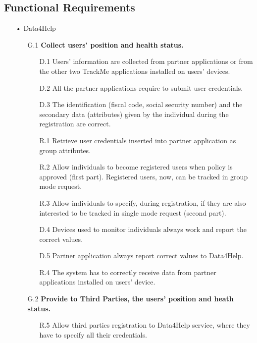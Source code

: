 \subsection{Functional Requirements}
\begin{enumerate}
\item[•]{\Large Data4Help}
	\begin{enumerate}
	\item [G.1] \textbf{Collect users' position and health status.}
		\begin{enumerate}
		\item [D.1] Users' information are collected from partner applications or from the other two TrackMe applications installed on users' devices.
		\item [D.2] All the partner applications require to submit user credentials.
		\item [D.3] The identification (fiscal code, social security number) and the secondary data (attributes) given by the individual during the registration are correct.
		\item [R.1] Retrieve user credentials inserted into partner application as group attributes.
		\item [R.2] Allow individuals to become registered users when policy is approved (first part). Registered users, now, can be tracked in group mode request.  
		\item [R.3] Allow individuals to specify, during registration, if they are also interested to be tracked in single mode request (second part).
		\item [D.4] Devices used to monitor individuals always work and report 			the correct values.	
    	\item [D.5] Partner application always report correct values to Data4Help.
    	\item [R.4] The system has to correctly receive data from partner applications installed on users' device.
    	\end{enumerate}	
    	
    \item [G.2] \textbf{Provide to Third Parties, the users' position and heath status.}
    	\begin{enumerate} 
    	\item [R.5] Allow third parties registration to Data4Help service, where they have to specify all their credentials.
    	\end{enumerate}	
		

\end{enumerate}
\end{enumerate}
